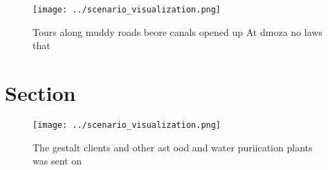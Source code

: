 \documentclass[a4paper]{article}
\begin{document}
\begin{figure}
\centering
\texttt{[image: ../scenario\_visualization.png]}
\caption{Tours along muddy roads beore canals opened up At dmoza no laws that 
}
\end{figure}
 
\section{Section}

\begin{figure}
\centering
\texttt{[image: ../scenario\_visualization.png]}
\caption{The gestalt clients and other ast ood and water puriication plants was sent on 
}
\end{figure}
 
\end{document}
